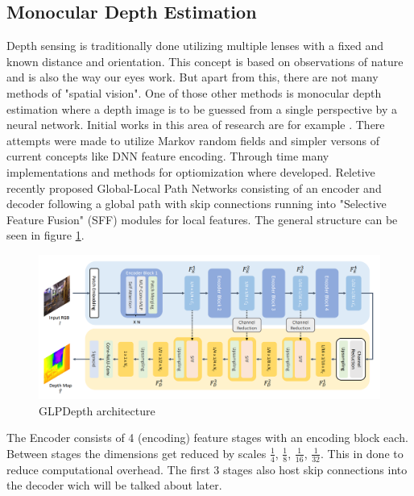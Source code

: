 \subsection*{Monocular Depth Estimation}

Depth sensing is traditionally done utilizing multiple lenses with a fixed and known distance and orientation. This concept is based on observations of nature and is also the way our eyes work.
But apart from this, there are not many methods of "spatial vision". One of those other methods is monocular depth estimation where a depth image is to be guessed from a single perspective by a neural network. Initial works in this area of research are for example \cite{Saxena} \cite{Eigen} \cite{Huynh} \cite{Yin}. There attempts were made to utilize Markov random fields and simpler versons of current concepts like DNN feature encoding.
Through time many implementations and methods for optiomization where developed. Reletive recently \cite{kim2022global} proposed Global-Local Path Networks consisting of an encoder and decoder following a global path with skip connections running into "Selective Feature Fusion" (SFF) modules for local features. The general structure can be seen in figure \ref*{GLPDepth_arch}.

\begin{figure}[ht]
    \begin{center}
        \includegraphics*[scale=.22, pagebox=artbox]{resources/GLPDepth.png}
        \caption{GLPDepth architecture \cite{kim2022global}} \label{GLPDepth_arch}
    \end{center}
\end{figure}

The Encoder consists of 4 (encoding) feature stages with an encoding block each. Between stages the dimensions get reduced by scales $\frac{1}{4}$, $\frac{1}{8}$, $\frac{1}{16}$, $\frac{1}{32}$. This in done to reduce computational overhead. The first 3 stages also host skip connections into the decoder wich will be talked about later.

